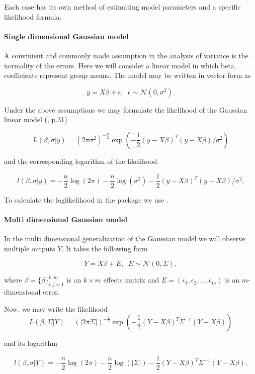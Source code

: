 Each case has its own method of estimating model parameters and a specific likelihood formula.

\paragraph{Single dimensional Gaussian model}

A convinient and commonly made assumption in the analysis of variance is the normality of the errors. Here we will consider a linear model in which beta coefficients represent group means. The model may be written in vector form as

$$y = X \beta + \epsilon, \;\; \epsilon \sim \mathcal{N}\left(0, \sigma^2\right).$$


Under the above assumptions we may formulate the likelihood of the Gaussian linear model (\citealp{friedman2001elements}, p.31)

$$L\left(\beta, \sigma | y\right) = \left(2\pi \sigma^2\right)^{-\frac{n}{2}} 
\exp{\left(-\frac{1}{2}\left(y - X\beta\right)^T\left(y - X\beta\right)/ \sigma^2\right)}$$

and the corresponding logarithm of the likelihood

$$l\left(\beta, \sigma | y\right) = 
-\frac{n}{2} \log{\left(2\pi\right)} -\frac{n}{2} \log{\left(\sigma^2\right)} -\frac{1}{2}\left(y - X\beta\right)^T\left(y - X\beta\right)/ \sigma^2.$$


To calculate the loglikelihood in the package we use .


\paragraph{Multi dimensional Gaussian model} In the multi dimensional generalization of the Gaussian model we will observe multiple outputs $Y$. It takes the following form

$$Y = X \beta + E, \;\; E \sim \mathcal{N}(0, \Sigma),$$

where $\beta = \{\beta\}_{i,j=1}^{k,m}$ is an $k \times m$ effects matrix and $E = \left(\epsilon_1, \epsilon_2, ..., \epsilon_m\right)$ is an $m$-dimensional error.

Now, we may write the likelihood 
$$L\left(\beta, \Sigma | Y\right) = \left(|2\pi \Sigma|\right)^{-\frac{1}{2}} 
\exp{\left(-\frac{1}{2}\left(Y - X\beta\right)^T\Sigma^{-1}\left(Y - X\beta\right)\right)}$$

and its logarithm

$$l\left(\beta, \sigma | Y\right) = 
-\frac{n}{2} \log{\left(2\pi\right)} -\frac{n}{2} \log{\left(|\Sigma|\right)} -\frac{1}{2}\left(Y - X\beta\right)^T\Sigma^{-1}\left(Y - X\beta\right).$$

